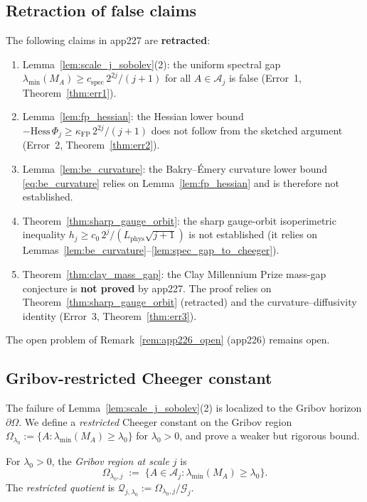 \subsection{Retraction of false claims}
\label{ssec:app227_retraction}

\begin{theorem}[Retraction]
\label{thm:retraction}
The following claims in app227 are \textbf{retracted}:
\begin{enumerate}
\item Lemma~\ref{lem:scale_j_sobolev}(2): the uniform spectral
gap $\lambda_{\min}(M_{A})\ge c_{\mathrm{spec}}\,2^{2j}/(j+1)$
for all $A\in\mathcal{A}_{j}$ is false (Error~1,
Theorem~\ref{thm:err1}).
\item Lemma~\ref{lem:fp_hessian}: the Hessian lower bound
$-\mathrm{Hess}\,\Phi_{j}\ge\kappa_{\mathrm{FP}}\,2^{2j}/(j+1)$
does not follow from the sketched argument (Error~2,
Theorem~\ref{thm:err2}).
\item Lemma~\ref{lem:be_curvature}: the Bakry--\'Emery curvature
lower bound \eqref{eq:be_curvature} relies on
Lemma~\ref{lem:fp_hessian} and is therefore not established.
\item Theorem~\ref{thm:sharp_gauge_orbit}: the sharp gauge-orbit
isoperimetric inequality
$h_{j}\ge c_{0}\,2^{j}/(L_{\mathrm{phys}}\sqrt{j+1})$ is not
established (it relies on
Lemmas~\ref{lem:be_curvature}--\ref{lem:spec_gap_to_cheeger}).
\item Theorem~\ref{thm:clay_mass_gap}: the Clay Millennium Prize
mass-gap conjecture is \textbf{not proved} by app227. The proof
relies on Theorem~\ref{thm:sharp_gauge_orbit} (retracted) and
the curvature--diffusivity identity (Error~3,
Theorem~\ref{thm:err3}).
\end{enumerate}
The open problem of Remark~\ref{rem:app226_open} (app226)
remains open.
\end{theorem}

\subsection{Gribov-restricted Cheeger constant}
\label{ssec:app228_gribov}

The failure of Lemma~\ref{lem:scale_j_sobolev}(2) is localized
to the Gribov horizon $\partial\Omega$. We define a
\emph{restricted} Cheeger constant on the Gribov region
$\Omega_{\lambda_{0}}:=\{A:\lambda_{\min}(M_{A})\ge\lambda_{0}
\}$ for $\lambda_{0}>0$, and prove a weaker but rigorous bound.

\begin{definition}
\label{def:gribov_region}
For $\lambda_{0}>0$, the \emph{Gribov region at scale $j$} is
\begin{equation}
\label{eq:gribov_region}
  \Omega_{\lambda_{0},j}
  \;:=\;\{A\in\mathcal{A}_{j}:
  \lambda_{\min}(M_{A})\ge\lambda_{0}\}.
\end{equation}
The \emph{restricted quotient} is
$\mathcal{Q}_{j,\lambda_{0}}:=\Omega_{\lambda_{0},j}/
\mathcal{G}_{j}$.
\end{definition}

